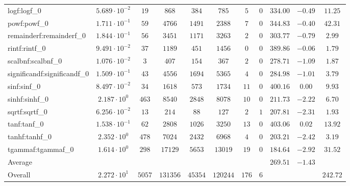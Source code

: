 \begin{tabular}{|l|c|c|c|c|c|c|c|c|c|c|}
logf:logf\_0                 & $ 5.689 \cdot 10^{-2} $ & $ 19     $ & $ 868    $ & $ 384   $ & $ 785    $ & $ 5   $ & $ 0 $ & $ 334.00      $ & $ -0.49   $ & $ 11.25   $ \\
powf:powf\_0                 & $ 1.711 \cdot 10^{-1} $ & $ 59     $ & $ 4766   $ & $ 1491  $ & $ 2388   $ & $ 7   $ & $ 0 $ & $ 344.83      $ & $ -0.40   $ & $ 42.31   $ \\
remainderf:remainderf\_0     & $ 1.844 \cdot 10^{-1} $ & $ 56     $ & $ 3451   $ & $ 1171  $ & $ 3263   $ & $ 2   $ & $ 0 $ & $ 303.77      $ & $ -0.79   $ & $ 2.99    $ \\
rintf:rintf\_0               & $ 9.491 \cdot 10^{-2} $ & $ 37     $ & $ 1189   $ & $ 451   $ & $ 1456   $ & $ 0   $ & $ 0 $ & $ 389.86      $ & $ -0.06   $ & $ 1.79    $ \\
scalbnf:scalbnf\_0           & $ 1.076 \cdot 10^{-2} $ & $ 3      $ & $ 407    $ & $ 154   $ & $ 367    $ & $ 2   $ & $ 0 $ & $ 278.71      $ & $ -1.09   $ & $ 1.87    $ \\
significandf:significandf\_0 & $ 1.509 \cdot 10^{-1} $ & $ 43     $ & $ 4556   $ & $ 1694  $ & $ 5365   $ & $ 4   $ & $ 0 $ & $ 284.98      $ & $ -1.01   $ & $ 3.79    $ \\
sinf:sinf\_0                 & $ 8.497 \cdot 10^{-2} $ & $ 34     $ & $ 1618   $ & $ 573   $ & $ 1734   $ & $ 11  $ & $ 0 $ & $ 400.16      $ & $ 0.00    $ & $ 9.93    $ \\
sinhf:sinhf\_0               & $ 2.187 \cdot 10^{0}  $ & $ 463    $ & $ 8540   $ & $ 2848  $ & $ 8078   $ & $ 10  $ & $ 0 $ & $ 211.73      $ & $ -2.22   $ & $ 6.70    $ \\
sqrtf:sqrtf\_0               & $ 6.256 \cdot 10^{-2} $ & $ 13     $ & $ 214    $ & $ 88    $ & $ 127    $ & $ 2   $ & $ 1 $ & $ 207.81      $ & $ -2.31   $ & $ 1.93    $ \\
tanf:tanf\_0                 & $ 1.538 \cdot 10^{-1} $ & $ 62     $ & $ 2808   $ & $ 1026  $ & $ 3250   $ & $ 13  $ & $ 0 $ & $ 403.06      $ & $ 0.02    $ & $ 13.92   $ \\
tanhf:tanhf\_0               & $ 2.352 \cdot 10^{0}  $ & $ 478    $ & $ 7024   $ & $ 2432  $ & $ 6968   $ & $ 4   $ & $ 0 $ & $ 203.21      $ & $ -2.42   $ & $ 3.19    $ \\
tgammaf:tgammaf\_0           & $ 1.614 \cdot 10^{0}  $ & $ 298    $ & $ 17129  $ & $ 5653  $ & $ 13019  $ & $ 19  $ & $ 0 $ & $ 184.64      $ & $ -2.92   $ & $ 31.52   $ \\
\hline
Average                      & $                     $ & $        $ & $        $ & $       $ & $        $ & $     $ & $   $ & $ 269.51      $ & $ -1.43   $ & $         $ \\
\hline
Overall                      & $ 2.272 \cdot 10^{1}  $ & $ 5057   $ & $ 131356 $ & $ 45354 $ & $ 120244 $ & $ 176 $ & $ 6 $ & $             $ & $         $ & $ 242.72  $ \\
\hline
\end{tabular}
